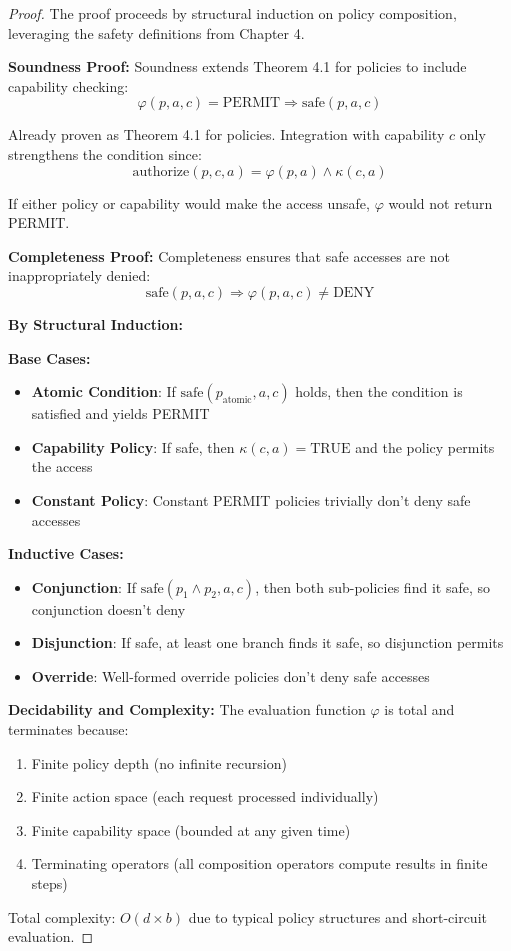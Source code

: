 \begin{proof}
The proof proceeds by structural induction on policy composition, leveraging the safety definitions from Chapter 4.

\textbf{Soundness Proof:}
Soundness extends Theorem 4.1 for policies to include capability checking:
$$\varphi(p,a,c) = \text{PERMIT} \Rightarrow \text{safe}(p,a,c)$$

Already proven as Theorem 4.1 for policies. Integration with capability $c$ only strengthens the condition since:
$$\text{authorize}(p,c,a) = \varphi(p,a) \land \kappa(c,a)$$

If either policy or capability would make the access unsafe, $\varphi$ would not return PERMIT.

\textbf{Completeness Proof:}
Completeness ensures that safe accesses are not inappropriately denied:
$$\text{safe}(p,a,c) \Rightarrow \varphi(p,a,c) \neq \text{DENY}$$

\textbf{By Structural Induction:}

\textbf{Base Cases:}
\begin{itemize}
\item \textbf{Atomic Condition}: If $\text{safe}(p_{\text{atomic}}, a, c)$ holds, then the condition is satisfied and yields PERMIT
\item \textbf{Capability Policy}: If safe, then $\kappa(c,a) = \text{TRUE}$ and the policy permits the access
\item \textbf{Constant Policy}: Constant PERMIT policies trivially don't deny safe accesses
\end{itemize}

\textbf{Inductive Cases:}
\begin{itemize}
\item \textbf{Conjunction}: If $\text{safe}(p_1 \land p_2, a, c)$, then both sub-policies find it safe, so conjunction doesn't deny
\item \textbf{Disjunction}: If safe, at least one branch finds it safe, so disjunction permits
\item \textbf{Override}: Well-formed override policies don't deny safe accesses
\end{itemize}

\textbf{Decidability and Complexity:}
The evaluation function $\varphi$ is total and terminates because:
\begin{enumerate}
\item Finite policy depth (no infinite recursion)
\item Finite action space (each request processed individually)
\item Finite capability space (bounded at any given time)
\item Terminating operators (all composition operators compute results in finite steps)
\end{enumerate}

Total complexity: $O(d \times b)$ due to typical policy structures and short-circuit evaluation.
\end{proof}

